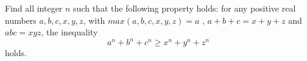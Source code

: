 Find all integer $n$ such that the following property holds: for any positive real numbers $a,b,c,x,y,z$, with $max(a,b,c,x,y,z)=a$ , $a+b+c=x+y+z$ and $abc=xyz$, the inequality $$a^n+b^n+c^n \ge x^n+y^n+z^n$$holds.